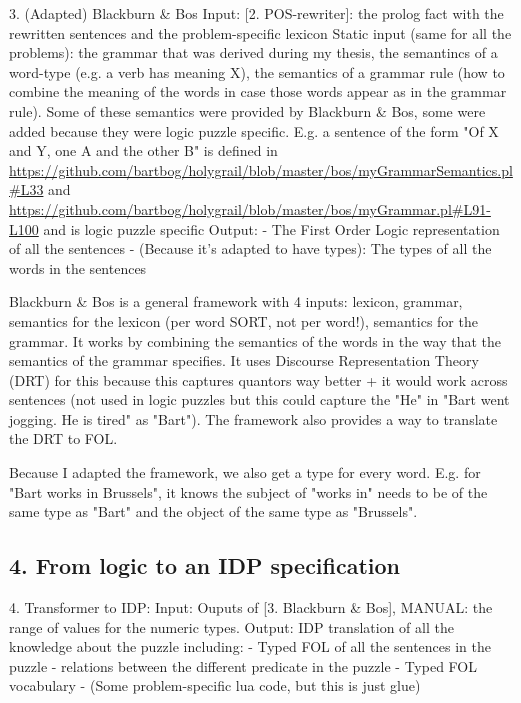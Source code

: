 3. (Adapted) Blackburn \& Bos
Input: [2. POS-rewriter]: the prolog fact with the rewritten sentences and the problem-specific lexicon
Static input (same for all the problems): the grammar that was derived during my thesis, the semantincs of a word-type (e.g. a verb has meaning X), the semantics of a grammar rule (how to combine the meaning of the words in case those words appear as in the grammar rule). Some of these semantics were provided by Blackburn \& Bos, some were added because they were logic puzzle specific. 
E.g. a sentence of the form "Of X and Y, one A and the other B" is defined in \url{https://github.com/bartbog/holygrail/blob/master/bos/myGrammarSemantics.pl#L33} and \url{https://github.com/bartbog/holygrail/blob/master/bos/myGrammar.pl#L91-L100} and is logic puzzle specific
Output: 
 - The First Order Logic representation of all the sentences
 - (Because it's adapted to have types): The types of all the words in the sentences

Blackburn \& Bos is a general framework with 4 inputs: lexicon, grammar, semantics for the lexicon (per word SORT, not per word!), semantics for the grammar. It works by combining the semantics of the words in the way that the semantics of the grammar specifies. It uses Discourse Representation Theory (DRT) for this because this captures quantors way better + it would work across sentences (not used in logic puzzles but this could capture the "He" in "Bart went jogging. He is tired" as "Bart"). The framework also provides a way to translate the DRT to FOL.

Because I adapted the framework, we also get a type for every word. E.g. for "Bart works in Brussels", it knows the subject of "works in" needs to be of the same type as "Bart" and the object of the same type as "Brussels". 

\subsection{4. From logic to an IDP specification}



4. Transformer to IDP:
Input: Ouputs of [3. Blackburn \& Bos], MANUAL: the range of values for the numeric types.
Output: IDP translation of all the knowledge about the puzzle including:
- Typed FOL of all the sentences in the puzzle
- relations between the different predicate in the puzzle
- Typed FOL vocabulary
- (Some problem-specific lua code, but this is just glue)

